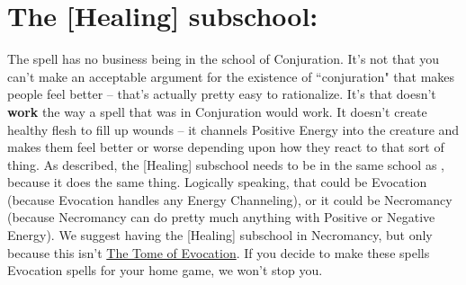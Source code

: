 \section{The [Healing] subschool:}

The spell  has no business being in the school of Conjuration. It's not that you can't make an acceptable argument for the existence of ``conjuration" that makes people feel better -- that's actually pretty easy to rationalize. It's that  doesn't \textbf{work} the way a spell that was in Conjuration would work. It doesn't create healthy flesh to fill up wounds -- it channels Positive Energy into the creature and makes them feel better or worse depending upon how they react to that sort of thing. As described, the [Healing] subschool needs to be in the same school as , because it does the same thing. Logically speaking, that could be Evocation (because Evocation handles any Energy Channeling), or it could be Necromancy (because Necromancy can do pretty much anything with Positive or Negative Energy). We suggest having the [Healing] subschool in Necromancy, but only because this isn't \underline{The Tome of Evocation}. If you decide to make these spells Evocation spells for your home game, we won't stop you.\\

